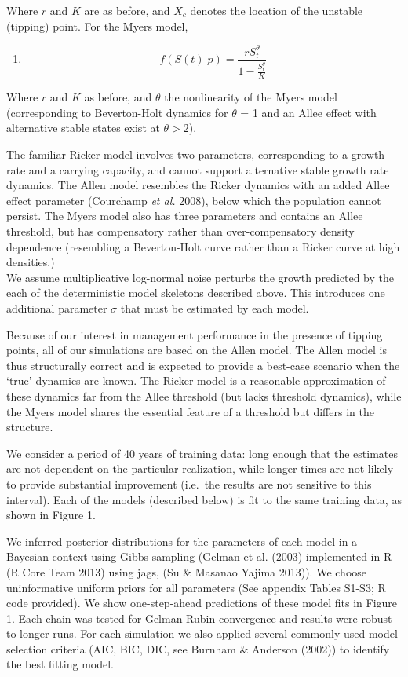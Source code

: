 \documentclass[author-year, 12pt,review]{elsarticle} %
\begin{document}
Where $r$ and $K$ are as before, and $X_c$ denotes the location of the
unstable (tipping) point. For the Myers model,

\begin{enumerate}
\def\labelenumi{(\arabic{enumi})}
\setcounter{enumi}{2}
\itemsep1pt\parskip0pt
\item
  \[ f(S(t) | p)  = \frac{r S_t^{\theta}}{1 - \frac{S_t^\theta}{K}}\]
\end{enumerate}

Where $r$ and $K$ as before, and $\theta$ the nonlinearity of the Myers
model (corresponding to Beverton-Holt dynamics for $\theta$ = 1 and an
Allee effect with alternative stable states exist at $\theta > 2$).

The familiar Ricker model involves two parameters, corresponding to a
growth rate and a carrying capacity, and cannot support alternative
stable growth rate dynamics. The Allen model resembles the Ricker
dynamics with an added Allee effect parameter (Courchamp \emph{et al.}
2008), below which the population cannot persist. The Myers model also
has three parameters and contains an Allee threshold, but has
compensatory rather than over-compensatory density dependence
(resembling a Beverton-Holt curve rather than a Ricker curve at high
densities.)\\We assume multiplicative log-normal noise perturbs the
growth predicted by the each of the deterministic model skeletons
described above. This introduces one additional parameter $\sigma$ that
must be estimated by each model.

Because of our interest in management performance in the presence of
tipping points, all of our simulations are based on the Allen model. The
Allen model is thus structurally correct and is expected to provide a
best-case scenario when the `true' dynamics are known. The Ricker model
is a reasonable approximation of these dynamics far from the Allee
threshold (but lacks threshold dynamics), while the Myers model shares
the essential feature of a threshold but differs in the structure.

We consider a period of 40 years of training data: long enough that the
estimates are not dependent on the particular realization, while longer
times are not likely to provide substantial improvement (i.e.~the
results are not sensitive to this interval). Each of the models
(described below) is fit to the same training data, as shown in Figure
1.

We inferred posterior distributions for the parameters of each model in
a Bayesian context using Gibbs sampling (Gelman et al. (2003)
implemented in R (R Core Team 2013) using jags, (Su \& Masanao Yajima
2013)). We choose uninformative uniform priors for all parameters (See
appendix Tables S1-S3; R code provided). We show one-step-ahead
predictions of these model fits in Figure 1. Each chain was tested for
Gelman-Rubin convergence and results were robust to longer runs. For
each simulation we also applied several commonly used model selection
criteria (AIC, BIC, DIC, see Burnham \& Anderson (2002)) to identify the
best fitting model.
\end{document}
